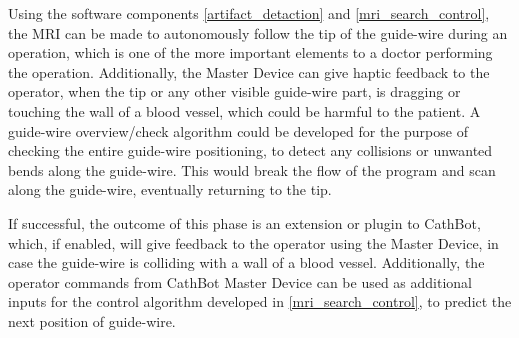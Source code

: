 \documentclass{article}
\begin{document}
Using the software components \ref{artifact_detaction} and \ref{mri_search_control}, the MRI can be made to autonomously follow the tip of the guide-wire during an operation, which is one of the more important elements to a doctor performing the operation. Additionally, the Master Device can give haptic feedback to the operator, when the tip or any other visible guide-wire part, is dragging or touching the wall of a blood vessel, which could be harmful to the patient. A guide-wire overview/check algorithm could be developed for the purpose of checking the entire guide-wire positioning, to detect any collisions or unwanted bends along the guide-wire. This would break the flow of the program and scan along the guide-wire, eventually returning to the tip.

If successful, the outcome of this phase is an extension or plugin to CathBot, which, if enabled, will give feedback to the operator using the Master Device, in case the guide-wire is colliding with a wall of a blood vessel.
Additionally, the operator commands from CathBot Master Device can be used as additional inputs for the control algorithm developed in \ref{mri_search_control}, to predict the next position of guide-wire.



\end{document}
